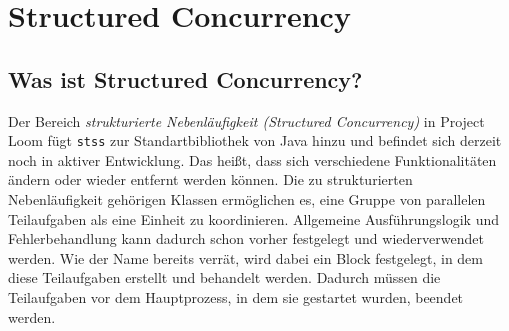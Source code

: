 \section{Structured Concurrency}                                 %
\label{sec:Structured Concurrency}


\subsection{Was ist Structured Concurrency?}
\label{subsec:WasistSC?}
    Der Bereich \emph{strukturierte Nebenläufigkeit (Structured Concurrency)} in Project Loom fügt \texttt{\Glspl{sts}} zur Standartbibliothek von Java hinzu
    und befindet sich derzeit noch in
    aktiver Entwicklung. Das heißt, dass sich verschiedene Funktionalitäten ändern oder wieder entfernt werden können.
    Die zu strukturierten Nebenläufigkeit gehörigen Klassen ermöglichen
    es, eine Gruppe von parallelen Teilaufgaben als eine Einheit zu koordinieren. Allgemeine Ausführungslogik und Fehlerbehandlung kann dadurch schon vorher festgelegt und 
    wiederverwendet werden.
    Wie der Name bereits verrät, wird dabei ein Block festgelegt, in dem diese Teilaufgaben erstellt und behandelt werden.
    Dadurch müssen die Teilaufgaben vor dem Hauptprozess, in dem sie gestartet wurden, beendet werden.
    \cite{oracle21SC}


